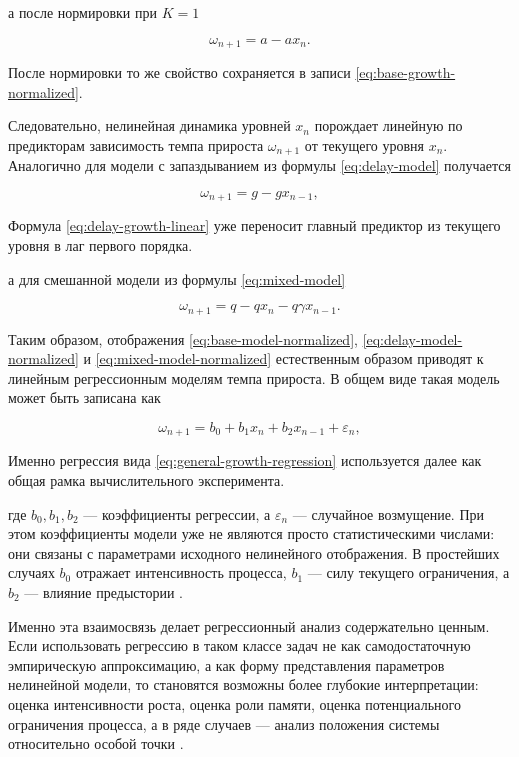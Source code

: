 а после нормировки при \(K=1\)

\begin{equation}
\omega_{n+1}=a-a x_n.
\label{eq:base-growth-normalized}
\end{equation}

После нормировки то же свойство сохраняется в записи \eqref{eq:base-growth-normalized}.

Следовательно, нелинейная динамика уровней \(x_n\) порождает линейную по предикторам зависимость темпа прироста \(\omega_{n+1}\) от текущего уровня \(x_n\). Аналогично для модели с запаздыванием из формулы \eqref{eq:delay-model} получается

\begin{equation}
\omega_{n+1}=g-gx_{n-1},
\label{eq:delay-growth-linear}
\end{equation}

Формула \eqref{eq:delay-growth-linear} уже переносит главный предиктор из текущего уровня в лаг первого порядка.

а для смешанной модели из формулы \eqref{eq:mixed-model}

\begin{equation}
\omega_{n+1}=q-qx_n-q\gamma x_{n-1}.
\label{eq:mixed-linearization}
\end{equation}

Таким образом, отображения \eqref{eq:base-model-normalized}, \eqref{eq:delay-model-normalized} и \eqref{eq:mixed-model-normalized} естественным образом приводят к линейным регрессионным моделям темпа прироста. В общем виде такая модель может быть записана как

\begin{equation}
\omega_{n+1}=b_0+b_1x_n+b_2x_{n-1}+\varepsilon_n,
\label{eq:general-growth-regression}
\end{equation}

Именно регрессия вида \eqref{eq:general-growth-regression} используется далее как общая рамка вычислительного эксперимента.

где \(b_0,b_1,b_2\) --- коэффициенты регрессии, а \(\varepsilon_n\) --- случайное возмущение. При этом коэффициенты модели уже не являются просто статистическими числами: они связаны с параметрами исходного нелинейного отображения. В простейших случаях \(b_0\) отражает интенсивность процесса, \(b_1\) --- силу текущего ограничения, а \(b_2\) --- влияние предыстории \cite{polunin-2019,polunin-yudanov-2020}.

Именно эта взаимосвязь делает регрессионный анализ содержательно ценным. Если использовать регрессию в таком классе задач не как самодостаточную эмпирическую аппроксимацию, а как форму представления параметров нелинейной модели, то становятся возможны более глубокие интерпретации: оценка интенсивности роста, оценка роли памяти, оценка потенциального ограничения процесса, а в ряде случаев --- анализ положения системы относительно особой точки \cite{polunin-2019,wooldridge}.

